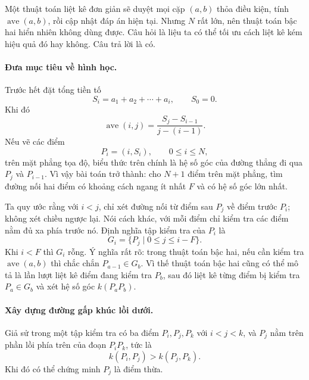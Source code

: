 \documentclass[11pt]{article}
\begin{document}
Một thuật toán liệt kê đơn giản sẽ duyệt mọi cặp $(a,b)$ thỏa điều kiện, tính
\(\operatorname{ave}(a,b)\), rồi cập nhật đáp án hiện tại. Nhưng $N$ rất lớn,
nên thuật toán bậc hai hiển nhiên không dùng được. Câu hỏi là liệu ta có thể
tối ưu cách liệt kê kém hiệu quả đó hay không. Câu trả lời là có.

\paragraph{Đưa mục tiêu về hình học.}
Trước hết đặt tổng tiền tố
\[
  S_i=a_1+a_2+\cdots+a_i,\qquad S_0=0.
\]
Khi đó
\[
  \operatorname{ave}(i,j)=\frac{S_j-S_{i-1}}{j-(i-1)}.
\]
Nếu vẽ các điểm
\[
  P_i=(i,S_i),\qquad 0\le i\le N,
\]
trên mặt phẳng tọa độ, biểu thức trên chính là hệ số góc của đường thẳng đi
qua $P_j$ và $P_{i-1}$. Vì vậy bài toán trở thành: cho $N+1$ điểm trên mặt
phẳng, tìm đường nối hai điểm có khoảng cách ngang ít nhất $F$ và có hệ số
góc lớn nhất.

Ta quy ước rằng với $i<j$, chỉ xét đường nối từ điểm sau $P_j$ về điểm trước
$P_i$; không xét chiều ngược lại. Nói cách khác, với mỗi điểm chỉ kiểm tra
các điểm nằm đủ xa phía trước nó. Định nghĩa tập kiểm tra của $P_i$ là
\[
  G_i=\{P_j\mid 0\le j\le i-F\}.
\]
Khi $i<F$ thì $G_i$ rỗng. Ý nghĩa rất rõ: trong thuật toán bậc hai, nếu cần
kiểm tra $\operatorname{ave}(a,b)$ thì chắc chắn $P_{a-1}\in G_b$. Vì thế
thuật toán bậc hai cũng có thể mô tả là lần lượt liệt kê điểm đang kiểm tra
$P_b$, sau đó liệt kê từng điểm bị kiểm tra $P_a\in G_b$ và xét hệ số góc
$k(P_aP_b)$.

\paragraph{Xây dựng đường gấp khúc lồi dưới.}
Giả sử trong một tập kiểm tra có ba điểm $P_i,P_j,P_k$ với $i<j<k$, và
$P_j$ nằm trên phần lồi phía trên của đoạn $P_iP_k$, tức là
\[
  k(P_i,P_j)>k(P_j,P_k).
\]
Khi đó có thể chứng minh $P_j$ là điểm thừa.

\begin{center}
\end{center}
\end{document}
